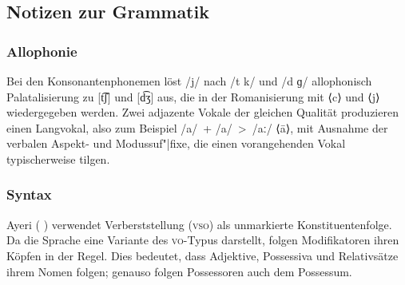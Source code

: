 \documentclass[
	12pt,
	ngerman,
]{scrartcl}
\let\q\textquote
\newcommand{\zwsp}{\mbox{​}} %
\newcommand{\ayr}[1]{\zwsp\smash{{\Tagati #1}}} %
\newcommand{\xayr}[3]{\zwsp\smash{\Tagati #1} \emph{#2} `#3'} %
\begin{document}
\subsection{Notizen zur Grammatik}
\label{subsec:gramnot}

\subsubsection{Allophonie}

Bei den Konsonantenphonemen löst /j/ nach /t k/ und /d ɡ/ allophonisch
Palatalisierung zu [t͡ʃ] und [d͡ʒ] aus, die in der Romanisierung mit ⟨c⟩ und
⟨j⟩ wiedergegeben werden.
Zwei adjazente Vokale der gleichen Qualität produzieren einen Langvokal, also
zum Beispiel /a/~+ /a/~>~/aː/ ⟨ā⟩, mit Ausnahme der verbalen Aspekt- und
Modussuf"|fixe, die einen vorangehenden Vokal typischerweise tilgen.

\subsubsection{Syntax}

Ayeri (\,\ayr{Ayeri}\,) verwendet Verberststellung (\textsc{vso}) als
unmarkierte Konstituentenfolge. Da die Sprache eine Variante des
\textsc{vo}-Typus darstellt, folgen Modifikatoren ihren Köpfen in der Regel.
Dies bedeutet, dass Adjektive, Possessiva und Relativsätze ihrem Nomen folgen;
genauso folgen Possessoren auch dem Possessum.

\end{document}
